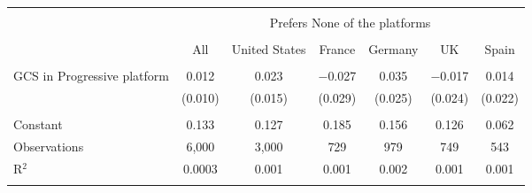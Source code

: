 
\begin{tabular}{@{\extracolsep{5pt}}lcccccc} 
\\[-1.8ex]\hline 
\hline \\[-1.8ex] 
 & \multicolumn{6}{c}{Prefers None of the platforms} \\ 
\cline{2-7} 
\\[-1.8ex] & All & United States & France & Germany & UK & Spain \\ 
\hline \\[-1.8ex] 
 GCS in Progressive platform & 0.012 & 0.023 & $-$0.027 & 0.035 & $-$0.017 & 0.014 \\ 
  & (0.010) & (0.015) & (0.029) & (0.025) & (0.024) & (0.022) \\ 
 \hline \\[-1.8ex] 
Constant & 0.133 & 0.127 & 0.185 & 0.156 & 0.126 & 0.062 \\ 
Observations & 6,000 & 3,000 & 729 & 979 & 749 & 543 \\ 
R$^{2}$ & 0.0003 & 0.001 & 0.001 & 0.002 & 0.001 & 0.001 \\ 
\hline 
\hline \\[-1.8ex] 
\end{tabular} 
